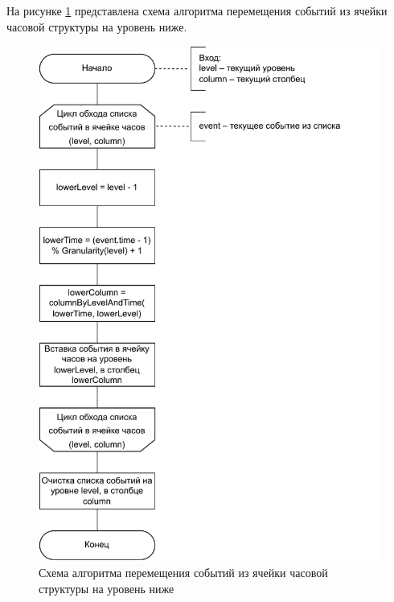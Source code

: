 \clearpage
На рисунке \ref{img:hybrid_moveEvents_schema} представлена схема алгоритма перемещения событий из ячейки часовой структуры на уровень ниже.
\begin{figure}[h!btp]
	\centering
	\includegraphics[width=0.8\columnwidth]{inc/img/hybrid_moveEvents_schema.pdf}
	\caption{Схема алгоритма перемещения событий из ячейки часовой структуры на уровень ниже}
	\label{img:hybrid_moveEvents_schema}	
\end{figure}

